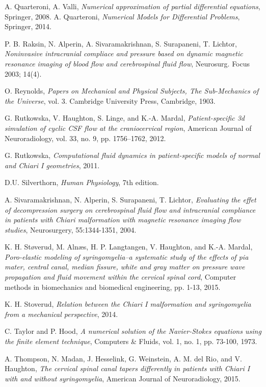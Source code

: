 \documentclass[a4paper,11pt,openright,twoside]{book}
\begin{document}
\begin{thebibliography}{100}
 A. Quarteroni, A. Valli, \emph{Numerical approximation of partial differential equations}, Springer, 2008.
 A. Quarteroni, \emph{Numerical Models for Differential Problems}, Springer, 2014.

 P. B. Raksin, N. Alperin, A. Sivaramakrishnan, S. Surapaneni, T. Lichtor, \emph{Noninvasive intracranial compliace and pressure based on dynamic magnetic resonance imaging of blood flow and cerebrospinal fluid flow}, Neurosurg. Focus 2003; 14(4).

 O. Reynolds, \emph{Papers on Mechanical and Physical Subjects, The Sub-Mechanics of the Universe}, vol. 3. Cambridge University Press, Cambridge, 1903.

  G. Rutkowska, V. Haughton, S. Linge, and K.-A. Mardal, \emph{Patient-specific 3d simulation of cyclic CSF flow at the craniocervical region}, American Journal of Neuroradiology, vol. 33, no. 9, pp. 1756–1762, 2012.

 G. Rutkowska, \emph{Computational fluid dynamics in patient-specific models of normal and Chiari I geometries}, 2011.

 D.U. Silverthorn, \emph{Human Physiology}, 7th edition.

 A. Sivaramakrishnan, N. Alperin, S. Surapaneni, T. Lichtor, \emph{Evaluating the effet of decompression surgery on cerebrospinal fluid flow and intracranial compliance in patients with Chiari malformation with magnetic resonance imaging flow studies}, Neurosurgery, 55:1344-1351, 2004.

 K. H. Støverud, M. Alnæs, H. P. Langtangen, V. Haughton, and K.-A. Mardal, \emph{Poro-elastic modeling of syringomyelia–a systematic study of the effects of pia mater, central canal, median fissure, white and gray matter on pressure wave propagation and fluid movement within the cervical spinal cord}, Computer methods in biomechanics and biomedical engineering, pp. 1-13, 2015.

 K. H. Stoverud, \emph{Relation between the Chiari I malformation and syringomyelia from a mechanical perspective}, 2014.

 C. Taylor and P. Hood, \emph{A numerical solution of the Navier-Stokes equations using the finite element technique}, Computers \& Fluids, vol. 1, no. 1, pp. 73-100, 1973.

 A. Thompson, N. Madan, J. Hesselink, G. Weinstein, A. M. del Rio, and V. Haughton, \emph{The cervical spinal canal tapers differently in patients with Chiari I with and without syringomyelia}, American Journal of Neuroradiology, 2015.


\end{thebibliography}
\end{document}
